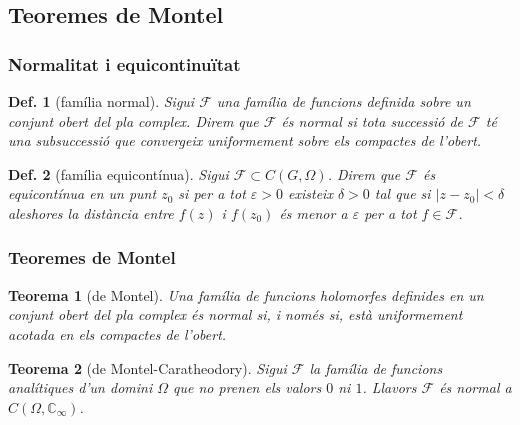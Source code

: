 \documentclass{beamer}
\newtheorem{defi}{Def.}[section]
\newtheorem{teorema}{Teorema}[section]
\begin{document}
\subsection{Teoremes de Montel}
\begin{frame}
\frametitle{Normalitat i equicontinuïtat}


\begin{defi}[família normal]
Sigui $\mathcal{F}$ una família de funcions definida sobre un conjunt obert del pla complex. Direm que $\mathcal{F}$ és normal si tota successió de $\mathcal{F}$ té una subsuccessió que convergeix uniformement sobre els compactes de l'obert.
\end{defi}

\begin{defi}[família equicontínua]
Sigui $\mathcal{F} \subset C(G,\Omega)$. Direm que $\mathcal{F}$ és equicontínua en un punt $z_0$ si per a tot $\varepsilon>0$ existeix $\delta>0$ tal que si $|z-z_0|<\delta$ aleshores la distància entre $f(z)$ i $f(z_0)$ és menor a $\varepsilon$ per a tot $f \in \mathcal{F}$.
\end{defi}

\end{frame}


\begin{frame}
\frametitle{Teoremes de Montel}

\begin{teorema}[de Montel]
Una família de funcions holomorfes definides en un conjunt obert del pla complex és normal si, i només si, està uniformement acotada en els compactes de l'obert.
\end{teorema}

\begin{teorema}[de Montel-Caratheodory]
Sigui $\mathcal{F}$ la família de funcions analítiques d'un domini $\Omega$ que no prenen els valors $0$ ni $1$. Llavors $\mathcal{F}$ és normal a $C(\Omega,\mathbb{C}_\infty)$.
\end{teorema}

\end{frame}


\end{document}
